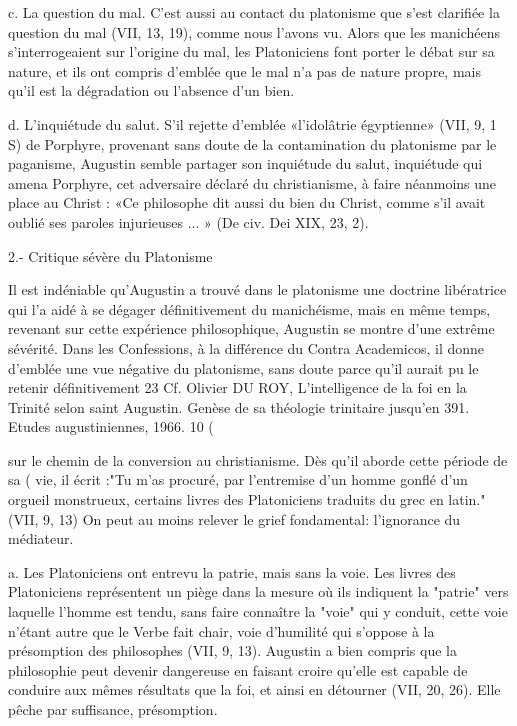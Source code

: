 c.	La question du mal. C'est aussi au contact du platonisme que s'est clarifiée la question du mal (VII, 13, 19), comme nous l'avons vu. Alors que les manichéens s'interrogeaient sur l'origine du mal, les Platoniciens font porter le débat sur sa nature, et ils ont compris d'emblée que le mal n'a pas de nature propre, mais qu'il est la dégradation ou l'absence d'un bien.

d.	L'inquiétude  du salut.  S'il rejette d'emblée «l'idolâtrie égyptienne» (VII, 9, 1 S) de Porphyre, provenant sans doute de la contamination du platonisme par le paganisme, Augustin semble partager son inquiétude du salut, inquiétude qui amena Porphyre, cet adversaire déclaré du christianisme, à faire néanmoins une place au Christ : «Ce philosophe dit aussi du bien du Christ, comme s'il avait oublié ses paroles injurieuses ... » (De civ. Dei XIX, 23, 2).

2.-  Critique  sévère  du Platonisme

Il est indéniable qu'Augustin a trouvé dans le platonisme une doctrine libératrice qui l'a aidé à se dégager définitivement du manichéisme, mais en même temps, revenant sur cette expérience philosophique, Augustin se montre d'une extrême sévérité. Dans les Confessions, à la différence du Contra Academicos, il donne d'emblée une vue négative  du  platonisme, sans doute parce qu'il aurait pu le retenir définitivement
23 Cf. Olivier DU ROY, L'intelligence de la foi en la Trinité selon saint Augustin. Genèse de sa théologie trinitaire jusqu'en 391. Etudes augustiniennes, 1966.
10
(
 
sur le chemin de la conversion au christianisme. Dès qu'il aborde cette période de sa	( vie, il  écrit :"Tu m'as procuré, par l'entremise  d'un homme  gonflé  d'un orgueil monstrueux, certains livres des Platoniciens traduits du grec en latin." (VII, 9, 13)
On peut au moins relever le grief fondamental: l'ignorance du médiateur.

a.	Les Platoniciens ont entrevu la patrie, mais sans  la voie. Les livres des Platoniciens représentent un piège dans la mesure où ils indiquent la "patrie" vers laquelle l'homme est tendu, sans faire connaître la "voie" qui y conduit, cette voie n'étant autre que le Verbe fait chair, voie d'humilité qui s'oppose à la présomption des philosophes (VII, 9, 13). Augustin a bien compris que la philosophie peut devenir dangereuse en faisant croire qu'elle est capable de conduire aux mêmes résultats que la foi, et ainsi en détourner (VII, 20, 26). Elle pêche par suffisance, présomption.

